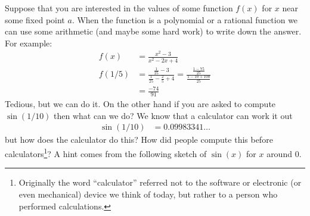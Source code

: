\graphicspath{{figures/differentiation/}}

\label{sec:DIFFTaylor}
Suppose that you are interested in the values of some function $f(x)$ for
$x$ near some fixed point $a$. When the function is a polynomial or a rational
function we can use some arithmetic (and maybe some hard work) to write down
the answer. For example:
\begin{align*}
  f(x) &= \frac{x^2-3}{x^2-2x+4} \\
  f(1/5) &= \frac{ \frac{1}{25}-3}{\frac{1}{25}-\frac{2}{5}+4 }
  = \frac{\frac{1-75}{25} }{\frac{1-10+100}{25}}\\
  &= \frac{-74}{91}
\end{align*}
Tedious, but we can do it. On the other hand if you are asked to compute
$\sin(1/10)$ then what can we do? We know that a calculator can work it out
\begin{align*}
  \sin(1/10) &= 0.09983341\dots
\end{align*}
but how does the calculator do this? How did people compute this before
calculators\footnote{Originally the word ``calculator'' referred not to the
software or electronic (or even mechanical) device we think of today, but
rather to a person who performed calculations.}? A hint comes from the
following sketch of $\sin(x)$ for $x$ around $0$.


